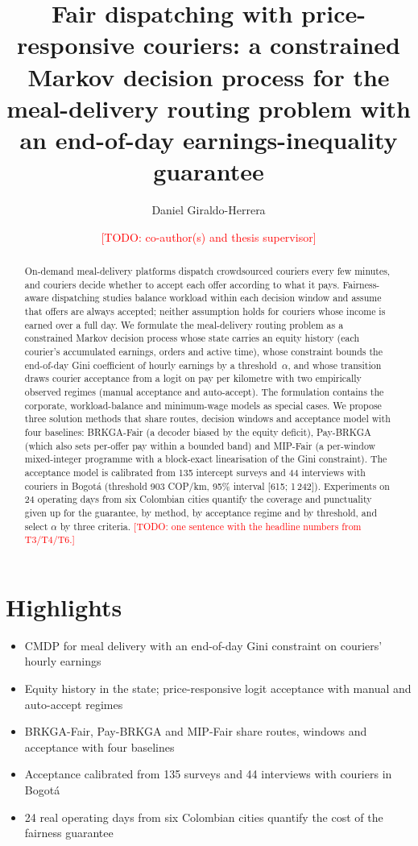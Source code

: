\documentclass[preprint,12pt,authoryear]{elsarticle}%
\newenvironment{frontmatter}{}{\maketitle}
\newenvironment{highlights}{\section*{Highlights}\begin{itemize}}{\end{itemize}}
\newcommand{\address}[2][]{}
\newcommand{\cortext}[2][]{}
\newcommand{\corref}[1]{}
\newcommand{\ead}[1]{}
\let\elsauthor\author
\renewcommand{\author}[2][]{\elsauthor{#2}}
\newcommand{\todo}[1]{\textcolor{red}{[TODO: #1]}}
\begin{document}
\begin{frontmatter}

\title{Fair dispatching with price-responsive couriers: a constrained Markov decision process for the meal-delivery routing problem with an end-of-day earnings-inequality guarantee}

\author[a]{Daniel Giraldo-Herrera\corref{cor1}}
\ead{\todo{email}}
\author[a]{\todo{co-author(s) and thesis supervisor}}
\address[a]{\todo{Department, University, City, Colombia}}
\cortext[cor1]{Corresponding author.}

\begin{abstract}
On-demand meal-delivery platforms dispatch crowdsourced couriers every few minutes, and couriers decide whether to accept each offer according to what it pays. Fairness-aware dispatching studies balance workload within each decision window and assume that offers are always accepted; neither assumption holds for couriers whose income is earned over a full day. We formulate the meal-delivery routing problem as a constrained Markov decision process whose state carries an equity history (each courier's accumulated earnings, orders and active time), whose constraint bounds the end-of-day Gini coefficient of hourly earnings by a threshold~$\alpha$, and whose transition draws courier acceptance from a logit on pay per kilometre with two empirically observed regimes (manual acceptance and auto-accept). The formulation contains the corporate, workload-balance and minimum-wage models as special cases. We propose three solution methods that share routes, decision windows and acceptance model with four baselines: BRKGA-Fair (a decoder biased by the equity deficit), Pay-BRKGA (which also sets per-offer pay within a bounded band) and MIP-Fair (a per-window mixed-integer programme with a block-exact linearisation of the Gini constraint). The acceptance model is calibrated from 135 intercept surveys and 44 interviews with couriers in Bogot\'a (threshold 903 COP/km, 95\% interval [615; 1\,242]). Experiments on 24 operating days from six Colombian cities quantify the coverage and punctuality given up for the guarantee, by method, by acceptance regime and by threshold, and select $\alpha$ by three criteria. \todo{one sentence with the headline numbers from T3/T4/T6.}
\end{abstract}

\begin{highlights}
\item CMDP for meal delivery with an end-of-day Gini constraint on couriers' hourly earnings
\item Equity history in the state; price-responsive logit acceptance with manual and auto-accept regimes
\item BRKGA-Fair, Pay-BRKGA and MIP-Fair share routes, windows and acceptance with four baselines
\item Acceptance calibrated from 135 surveys and 44 interviews with couriers in Bogot\'a
\item 24 real operating days from six Colombian cities quantify the cost of the fairness guarantee
\end{highlights}


\end{frontmatter}
\end{document}
